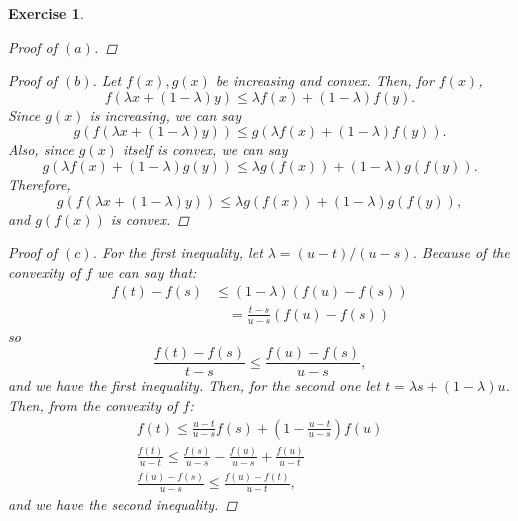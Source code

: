 \documentclass[10pt,letterpaper]{amsart}
\newtheorem{exercise}{Exercise}[section]
\theoremstyle{definition}
\theoremstyle{remark}
\numberwithin{equation}{exercise}
\begin{document}
\begin{multicols}{2}
\begin{exercise}
\begin{proof}[Proof of $(a)$]
    \end{proof}
    \begin{proof}[Proof of $(b)$]
      Let $f(x), g(x)$ be increasing and convex. Then, for $f(x)$,
      \begin{equation*}
        f(\lambda x + (1-\lambda) y) \le \lambda f(x) + (1-\lambda)f(y).
      \end{equation*}
      Since $g(x)$ is increasing, we can say
      \begin{equation*}
        g(f(\lambda x + (1-\lambda) y))
        \le g(\lambda f(x) + (1-\lambda)f(y)).
      \end{equation*}
      Also, since $g(x)$ itself is convex, we can say
      \begin{equation*}
        g(\lambda f(x) + (1-\lambda) g(y))
        \le \lambda g(f(x)) + (1-\lambda)g(f(y)).
      \end{equation*}
      Therefore,
      \begin{equation*}
        g(f(\lambda x + (1-\lambda) y))
        \le \lambda g(f(x)) + (1-\lambda)g(f(y)),
      \end{equation*}
      and $g(f(x))$ is convex.
    \end{proof}
    \begin{proof}[Proof of $(c)$]
      For the first inequality, let $\lambda = (u-t)/(u-s)$. Because of the convexity of $f$ we can say that:
      \begin{align*}
        f(t) - f(s) &\le (1-\lambda)\left(f(u)-f(s)\right)\\
        &\quad= \frac{t-s}{u-s} \left( f(u) - f(s) \right)
      \end{align*}
      so
      \begin{equation*}
        \frac{f(t) - f(s)}{t-s} \le \frac{f(u) - f(s)}{u-s},
      \end{equation*}
      and we have the first inequality. Then, for the second one let $t = \lambda s + (1-\lambda) u$. Then, from the convexity of $f$:
      \begin{gather*}
        f(t) \le \frac{u-t}{u-s}f(s) + \left(1 - \frac{u-t}{u-s}\right) f(u)\\
        \frac{f(t)}{u-t} \le \frac{f(s)}{u-s} - \frac{f(u)}{u-s}+ \frac{f(u)}{u-t}\\
        \frac{f(u)-f(s)}{u-s} \le \frac{f(u)-f(t)}{u-t},
      \end{gather*}
      and we have the second inequality.
    \end{proof}
  \end{exercise}

\end{multicols}
\end{document}

